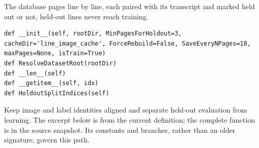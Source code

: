 The database pages line by line, each paired with its transcript and marked held out or not, held-out lines never reach training.


\begin{lstlisting}[style=plain]
def __init__(self, rootDir, MinPagesForHoldout=3, cacheDir='line_image_cache', ForceRebuild=False, SaveEveryNPages=10, maxPages=None, isTrain=True)
def ResolveDatasetRoot(rootDir)
def __len__(self)
def __getitem__(self, idx)
def HoldoutSplitIndices(self)
\end{lstlisting}
Keep image and label identities aligned and separate held-out evaluation from learning. The excerpt below is from the current definition; the complete function is in the source snapshot. Its constants and branches, rather than an older signature, govern this path.



